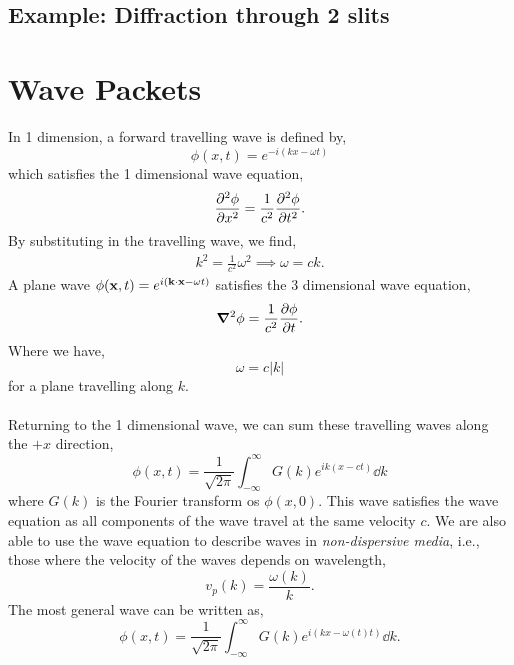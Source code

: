 \documentclass{book}
\begin{document}
\subsection{Example: Diffraction through 2 slits}

\section{Wave Packets}
In 1 dimension, a forward travelling wave is defined by,
\begin{equation}
	\phi(x,t) = e^{-i\left(kx - \omega t\right)}
\end{equation}
which satisfies the 1 dimensional wave equation,
\begin{equation}
	\pdv[2]{\phi}{x} = \frac{1}{c^2}\pdv[2]{\phi}{t}.
\end{equation}
By substituting in the travelling wave, we find,
\begin{align}
	k^2 = \frac{1}{c^2}\omega^2 \implies \omega = ck. 
\end{align}
A plane wave $\phi(\vb{x},t) = e^{i(\vb{k}\cdot\vb{x} - \omega t)}$ satisfies the 3 dimensional wave equation,
\begin{equation}
	\grad^2\phi = \frac{1}{c^2}\pdv{\phi}{t}.
\end{equation}
Where we have,
\begin{equation}
	\omega = c|k|
\end{equation}
for a plane travelling along $k$.
\\\\
Returning to the 1 dimensional wave, we can sum these travelling waves along the $+x$ direction,
\begin{equation}
	\phi(x,t) = \frac{1}{\sqrt{2\pi}}\int_{-\infty}^{\infty}G(k)e^{ik(x-ct)}\dd{k}
\end{equation}
where $G(k)$ is the Fourier transform os $\phi(x,0)$. This wave satisfies the wave equation as all components of the wave travel at the same velocity $c$. We are also able to use the wave equation to describe waves in \textit{non-dispersive media}, i.e., those where the velocity of the waves depends on wavelength,
\begin{equation}
	v_p(k) = \frac{\omega(k)}{k}.
\end{equation}
The most general wave can be written as,
\begin{equation}
	\boxed{\phi(x,t) = \frac{1}{\sqrt{2\pi}}\int_{-\infty}^{\infty}G(k)e^{i(kx - \omega(t)t)}\dd{k}}.
\end{equation}
\end{document}
